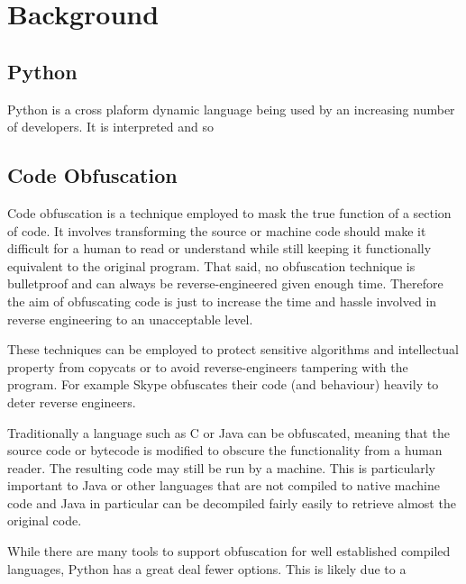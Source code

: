 \documentclass{report}
\begin{document}
\section{Background}

\subsection{Python}

Python is a cross plaform dynamic language being used by an increasing
number of developers. It is interpreted and so 

\subsection{Code Obfuscation}

Code obfuscation is a technique employed to mask the true function
of a section of code. It involves transforming the source or machine
code should make it difficult for a human to read or understand
while still keeping it functionally equivalent to the original
program. That said, no obfuscation technique is bulletproof and can
always be reverse-engineered given enough time. Therefore the aim of
obfuscating code is just to increase the time and hassle involved in
reverse engineering to an unacceptable level.

These techniques can be employed to protect sensitive algorithms and
intellectual property from copycats or to avoid reverse-engineers
tampering with the program. For example Skype obfuscates their code
(and behaviour) heavily to deter reverse engineers.


Traditionally a language such as C or Java can be obfuscated,
meaning that the source code or bytecode is modified to obscure the
functionality from a human reader. The resulting code may still be
run by a machine. This is particularly important to Java or other
languages that are not compiled to native machine code and Java in
particular can be decompiled fairly easily to retrieve almost the
original code.

While there are many tools to support obfuscation for well
established compiled languages, Python has a great deal fewer
options. This is likely due to a
\end{document}
